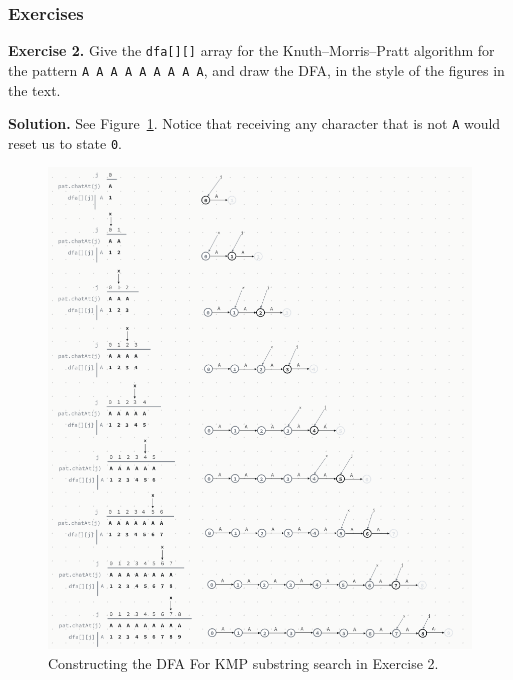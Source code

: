 \documentclass[12pt, a4paper]{article}
\newenvironment{ex}[2][Exercise]
{\par\medskip\noindent \textbf{#1 #2.}}
{\medskip}
\newenvironment{sol}[1][Solution]
{\par\medskip\noindent \textbf{#1.} }
{\medskip}
\begin{document}
	\subsubsection*{Exercises}
	\begin{ex}{2}
		Give the \texttt{dfa[][]} array for the Knuth--Morris--Pratt algorithm for the pattern
		\texttt{A A A A A A A A A}, and draw the DFA, in the style of the figures in the text.
	\end{ex}
	\begin{sol}
		See Figure~\ref{fig:ex-02}. Notice that receiving any character that is not \texttt{A}
		would reset us to state \texttt{0}.
		\begin{figure}
			\centering
			\includegraphics[width=1.0\textwidth]{exercise-02}
			\caption{Constructing the DFA For KMP substring search in Exercise 2.}
			\label{fig:ex-02}
		\end{figure}
	\end{sol}
	
	
	\pagebreak
	\printbibliography
\end{document}

